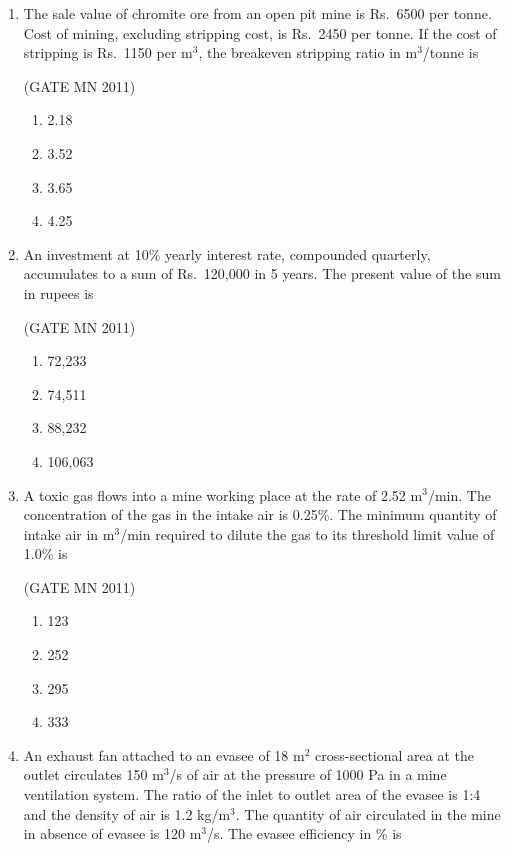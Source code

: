 \documentclass[journal]{IEEEtran}
\begin{document}
\begin{enumerate}
\item The sale value of chromite ore from an open pit mine is Rs.\ 6500 per tonne. 
Cost of mining, excluding stripping cost, is Rs.\ 2450 per tonne. 
If the cost of stripping is Rs.\ 1150 per m$^3$, the breakeven stripping ratio in m$^3$/tonne is

\hfill(GATE MN 2011)
\begin{multicols}{4}
\begin{enumerate}
  \item 2.18
  \item 3.52
  \item 3.65
  \item 4.25
\end{enumerate}
\end{multicols}

\item An investment at 10\% yearly interest rate, compounded quarterly, accumulates to a sum of Rs.\ 120,000 in 5 years. 
The present value of the sum in rupees is

\hfill(GATE MN 2011)
\begin{multicols}{4}
\begin{enumerate}
  \item 72,233
  \item 74,511
  \item 88,232
  \item 106,063
\end{enumerate}
\end{multicols}

\item A toxic gas flows into a mine working place at the rate of 2.52 m$^3$/min. 
The concentration of the gas in the intake air is 0.25\%. 
The minimum quantity of intake air in m$^3$/min required to dilute the gas to its threshold limit value of 1.0\% is

\hfill(GATE MN 2011)
\begin{multicols}{4}
\begin{enumerate}
  \item 123
  \item 252
  \item 295
  \item 333
\end{enumerate}
\end{multicols}

\item An exhaust fan attached to an evasee of 18 m$^2$ cross-sectional area at the outlet circulates 150 m$^3$/s of air at the pressure of 1000 Pa in a mine ventilation system. 
The ratio of the inlet to outlet area of the evasee is 1:4 and the density of air is 1.2 kg/m$^3$. 
The quantity of air circulated in the mine in absence of evasee is 120 m$^3$/s. 
The evasee efficiency in \% is


\end{enumerate}
\end{document}
